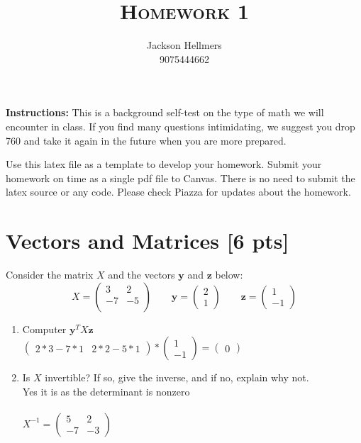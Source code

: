 \documentclass[a4paper]{article}
\title{\textsc{Homework 1}} %
\author{
	Jackson Hellmers \\
	9075444662\\
}
\date{}
\theoremstyle{definition}
\newenvironment{soln}{
	\leavevmode\color{blue}\ignorespaces
}{}
\begin{document}
	
	\maketitle 
	
	
	\textbf{Instructions:} 
	This is a background self-test on the type of math we will encounter in class. If you find many questions intimidating, we suggest you drop 760 and take it again in the future when you are more prepared.
	
	Use this latex file as a template to develop your homework.
	Submit your homework on time as a single pdf file to Canvas.
	There is no need to submit the latex source or any code.
	Please check Piazza for updates about the homework.
	
	
	\section{Vectors and Matrices [6 pts]}
	Consider the matrix $X$ and the vectors $\mathbf{y}$ and $\textbf{z}$ below:
	$$
	X = \begin{pmatrix}
		3 & 2 \\ -7 & -5 \\
	\end{pmatrix}
	\qquad \mathbf{y} = \begin{pmatrix}
		2 \\ 1
	\end{pmatrix} \qquad \mathbf{z} = \begin{pmatrix}
		1 \\ -1
	\end{pmatrix}
	$$
	\begin{enumerate}
		\item 	Computer $\mathbf{y}^{T} X \mathbf{z}$\\
			    \begin{soln} $
			        \begin{pmatrix}
			        2*3-7*1 & 2*2-5*1
			        \end{pmatrix}*
			        \begin{pmatrix}
			        1 \\
			        -1
			        \end{pmatrix} =
			        \begin{pmatrix}
		            0
			        \end{pmatrix}$
			    \end{soln}
		\item 	Is $X$ invertible? If so, give the inverse, and if no, explain why not.\\
		        \begin{soln}  Yes it is as the determinant is nonzero \\ \\
		        $X^{-1} = 
		        \begin{pmatrix}
		            5 & 2 \\
		            -7 & -3
		        \end{pmatrix}$
		        \end{soln}
	\end{enumerate}
	
\end{document}
